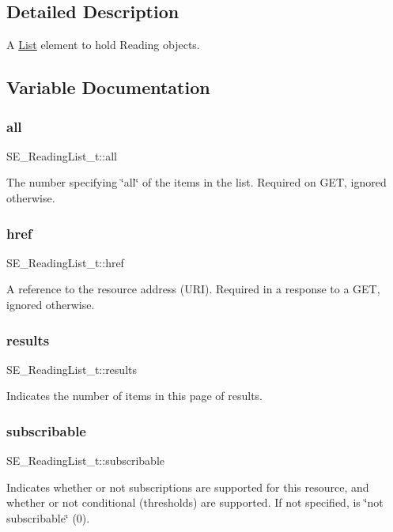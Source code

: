 \subsection{Detailed Description}
A \hyperlink{structList}{List} element to hold Reading objects. 

\subsection{Variable Documentation}
\mbox{\label{group__ReadingList_ga286e4a2b165954ebcbb3d051b2a2943d}} 
\subsubsection{\texorpdfstring{all}{all}}
{\footnotesize\ttfamily S\+E\+\_\+\+Reading\+List\+\_\+t\+::all}

The number specifying \char`\"{}all\char`\"{} of the items in the list. Required on G\+ET, ignored otherwise. \mbox{\label{group__ReadingList_gafacf2687a03d5902e11e06224e91c913}} 
\subsubsection{\texorpdfstring{href}{href}}
{\footnotesize\ttfamily S\+E\+\_\+\+Reading\+List\+\_\+t\+::href}

A reference to the resource address (U\+RI). Required in a response to a G\+ET, ignored otherwise. \mbox{\label{group__ReadingList_ga8729b48b25f26873984e4198c0fc2cbf}} 
\subsubsection{\texorpdfstring{results}{results}}
{\footnotesize\ttfamily S\+E\+\_\+\+Reading\+List\+\_\+t\+::results}

Indicates the number of items in this page of results. \mbox{\label{group__ReadingList_ga54934e5a4ccf3fcbd4c0ce1cdf10ae39}} 
\subsubsection{\texorpdfstring{subscribable}{subscribable}}
{\footnotesize\ttfamily S\+E\+\_\+\+Reading\+List\+\_\+t\+::subscribable}

Indicates whether or not subscriptions are supported for this resource, and whether or not conditional (thresholds) are supported. If not specified, is \char`\"{}not subscribable\char`\"{} (0). 